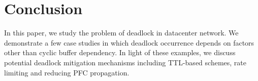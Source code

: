 \secspacelarge
\section{Conclusion}
\secspace

In this paper, we study the problem of deadlock in datacenter network. 
We demonstrate a few case studies in which deadlock occurrence depends on
factors other than cyclic buffer dependency. In light of these examples, we discuss 
potential deadlock mitigation mechanisms including TTL-based schemes, rate limiting and reducing
PFC propagation.

